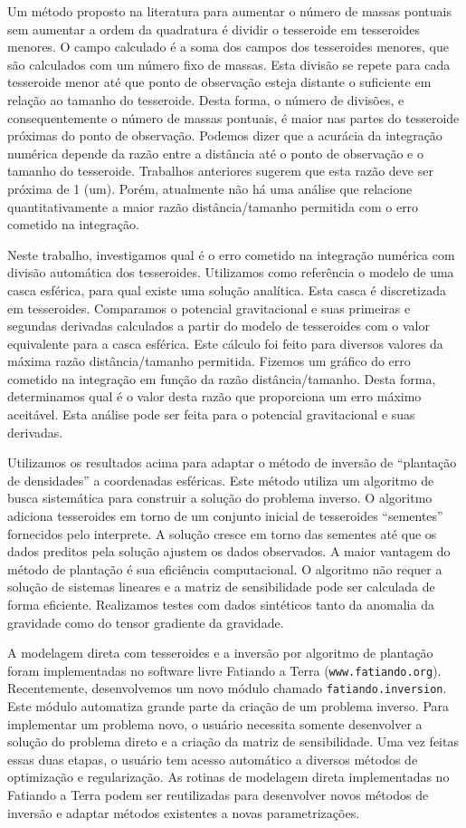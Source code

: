 \documentclass[12pt]{letter}
\begin{document}
Um método proposto na literatura
para aumentar o número de massas pontuais
sem aumentar a ordem da quadratura
é dividir o tesseroide em tesseroides menores.
O campo calculado
é a soma dos campos dos tesseroides menores,
que são calculados
com um número fixo de massas.
Esta divisão se repete
para cada tesseroide menor
até que ponto de observação
esteja distante o suficiente
em relação ao tamanho do tesseroide.
Desta forma,
o número de divisões,
e consequentemente o número de massas pontuais,
é maior nas partes do tesseroide
próximas do ponto de observação.
Podemos dizer que
a acurácia da integração numérica
depende da razão entre
a distância até o ponto de observação
e o tamanho do tesseroide.
Trabalhos anteriores
sugerem que esta razão
deve ser próxima de 1 (um).
Porém,
atualmente não há uma análise
que relacione quantitativamente
a maior razão distância/tamanho permitida
com o erro cometido na integração.

Neste trabalho,
investigamos qual é o erro
cometido na integração numérica
com divisão automática dos tesseroides.
Utilizamos como referência
o modelo de uma casca esférica,
para qual existe
uma solução analítica.
Esta casca é discretizada em tesseroides.
Comparamos o potencial gravitacional
e suas primeiras e segundas derivadas
calculados a partir do modelo de tesseroides
com o valor equivalente
para a casca esférica.
Este cálculo foi feito
para diversos valores
da máxima razão distância/tamanho permitida.
Fizemos um gráfico
do erro cometido na integração
em função da razão distância/tamanho.
Desta forma,
determinamos qual é o valor desta razão
que proporciona um erro máximo aceitável.
Esta análise pode ser feita
para o potencial gravitacional e suas derivadas.

Utilizamos os resultados acima
para adaptar o método de inversão de ``plantação de densidades''
a coordenadas esféricas.
Este método utiliza
um algoritmo de busca sistemática
para construir a solução do problema inverso.
O algoritmo adiciona tesseroides
em torno de um conjunto inicial
de tesseroides ``sementes''
fornecidos pelo interprete.
A solução cresce
em torno das sementes
até que os dados preditos pela solução
ajustem os dados observados.
A maior vantagem do método de plantação
é sua eficiência computacional.
O algoritmo não requer
a solução de sistemas lineares
e a matriz de sensibilidade
pode ser calculada de forma eficiente.
Realizamos testes
com dados sintéticos
tanto da anomalia da gravidade
como do tensor gradiente da gravidade.

A modelagem direta com tesseroides
e a inversão por algoritmo de plantação
foram implementadas no software livre
Fatiando a Terra (\texttt{www.fatiando.org}).
Recentemente,
desenvolvemos um novo módulo
chamado \texttt{fatiando.inversion}.
Este módulo
automatiza grande parte
da criação de um problema inverso.
Para implementar um problema novo,
o usuário necessita somente desenvolver
a solução do problema direto
e a criação da matriz de sensibilidade.
Uma vez feitas essas duas etapas,
o usuário tem acesso automático
a diversos métodos de optimização e regularização.
As rotinas de modelagem direta
implementadas no Fatiando a Terra
podem ser reutilizadas
para desenvolver novos métodos de inversão
e adaptar métodos existentes a novas parametrizações.
\end{document}
